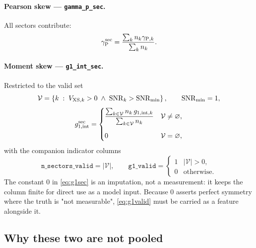 \documentclass[11pt]{article}
\begin{document}
\paragraph{Pearson skew --- \texttt{gamma\_p\_sec}.} All sectors contribute:
%
\begin{equation}
  \gamma_{\rm P}^{\rm sec} = \frac{\sum_k n_k \gamma_{{\rm P},k}}{\sum_k n_k} .
  \label{eq:gpsec}
\end{equation}

\paragraph{Moment skew --- \texttt{g1\_int\_sec}.} Restricted to the valid set
%
\begin{equation}
  \mathcal{V} = \left\{k \;:\; V_{{\rm XS},k} > 0 \;\wedge\;
                  \mathrm{SNR}_k > \mathrm{SNR}_{\min}\right\},
  \qquad \mathrm{SNR}_{\min} = 1 ,
  \label{eq:valid}
\end{equation}
%
\begin{equation}
  g_{1,{\rm int}}^{\rm sec} =
  \begin{cases}
    \displaystyle
    \frac{\sum_{k \in \mathcal{V}} n_k \, g_{1,{\rm int},k}}
         {\sum_{k \in \mathcal{V}} n_k}
      & \mathcal{V} \neq \varnothing, \\[14pt]
    0 & \mathcal{V} = \varnothing,
  \end{cases}
  \label{eq:g1sec}
\end{equation}
%
with the companion indicator columns
%
\begin{equation}
  \texttt{n\_sectors\_valid} = |\mathcal{V}|,
  \qquad
  \texttt{g1\_valid} =
  \begin{cases}
    1 & |\mathcal{V}| > 0,\\
    0 & \text{otherwise.}
  \end{cases}
  \label{eq:g1valid}
\end{equation}
%
The constant $0$ in \eqref{eq:g1sec} is an imputation, not a measurement: it keeps the
column finite for direct use as a model input. Because $0$ asserts perfect symmetry
where the truth is "not measurable", \eqref{eq:g1valid} must be carried as a feature
alongside it.

\subsection{Why these two are not pooled}
\end{document}
